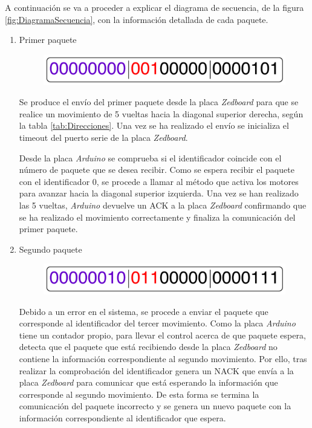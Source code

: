 A continuación se va a proceder a explicar el diagrama de secuencia, de la figura \ref{fig:DiagramaSecuencia}, con la información detallada de cada paquete.

\begin{enumerate}

\item Primer paquete
\begin{figure}[hbtp]
\centering
	\includegraphics[width=.9\textwidth]{./figures/Comunicacion1.pdf}
	\label{fig:Comunicacion1}
\end{figure}

Se produce el envío del primer paquete desde la placa \emph{Zedboard} para que se realice un movimiento de 5 vueltas hacia la diagonal superior derecha, según la tabla \ref{tab:Direcciones}. Una vez se ha realizado el envío se inicializa el timeout del puerto serie de la placa \emph{Zedboard}. 

Desde la placa \emph{Arduino} se comprueba si el identificador coincide con el número de paquete que se desea recibir. Como se espera recibir el paquete con el identificador 0, se procede a llamar al método que activa los motores para avanzar hacia la diagonal superior izquierda. Una vez se han realizado las 5 vueltas, \emph{Arduino} devuelve un ACK a la placa \emph{Zedboard} confirmando que se ha realizado el movimiento correctamente  y finaliza la comunicación del primer paquete.


\item Segundo paquete
\begin{figure}[hbtp]
\centering
	\includegraphics[width=.9\textwidth]{./figures/Comunicacion3.pdf}
	\label{fig:Comunicacion1}
\end{figure}

Debido a un error en el sistema, se procede a enviar el paquete que corresponde al identificador del tercer movimiento. Como la placa \emph{Arduino} tiene un contador propio, para llevar el control acerca de que paquete espera, detecta que el paquete que está recibiendo desde la placa \emph{Zedboard} no contiene la información correspondiente al segundo movimiento. Por ello, tras realizar la comprobación del identificador genera un NACK que envía a la placa \emph{Zedboard} para comunicar que está esperando la información que corresponde al segundo movimiento. De esta forma se termina la comunicación del paquete incorrecto y se genera un nuevo paquete con la información correspondiente al identificador que espera.


\end{enumerate}
